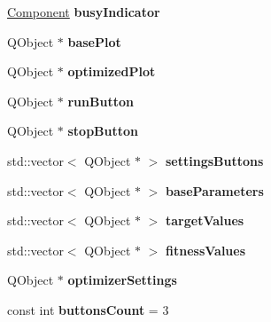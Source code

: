 \begin{DoxyCompactItemize}
\hyperlink{struct_component}{Component} {\bfseries busy\+Indicator}
\item 
\mbox{\label{struct_main_window_objects_ac937bbf4b515456afc0a02a69b864da2}} 
Q\+Object $\ast$ {\bfseries base\+Plot}
\item 
\mbox{\label{struct_main_window_objects_a340c6d92e16fc0e18c084ccb31022002}} 
Q\+Object $\ast$ {\bfseries optimized\+Plot}
\item 
\mbox{\label{struct_main_window_objects_ad56f352e1aef36d43dbfd98d9275a104}} 
Q\+Object $\ast$ {\bfseries run\+Button}
\item 
\mbox{\label{struct_main_window_objects_a0e90147f2b6515e2fb72d81e1a332d52}} 
Q\+Object $\ast$ {\bfseries stop\+Button}
\item 
\mbox{\label{struct_main_window_objects_a98363267c86a7f59c7693ca5be07b3ee}} 
std\+::vector$<$ Q\+Object $\ast$ $>$ {\bfseries settings\+Buttons}
\item 
\mbox{\label{struct_main_window_objects_a1abbb394cc7ea94d4cd9d37f53e373a2}} 
std\+::vector$<$ Q\+Object $\ast$ $>$ {\bfseries base\+Parameters}
\item 
\mbox{\label{struct_main_window_objects_af9867c17eb5a246afe57fef072c42950}} 
std\+::vector$<$ Q\+Object $\ast$ $>$ {\bfseries target\+Values}
\item 
\mbox{\label{struct_main_window_objects_a0c7e32f66c72e8a5d4f59a4a1c3d2ae3}} 
std\+::vector$<$ Q\+Object $\ast$ $>$ {\bfseries fitness\+Values}
\item 
\mbox{\label{struct_main_window_objects_a025c228783402e4171b6b10255e6c299}} 
Q\+Object $\ast$ {\bfseries optimizer\+Settings}
\item 
\mbox{\label{struct_main_window_objects_afefa46ef2b7b2bbb8463510cbd1fa96c}} 
const int {\bfseries buttons\+Count} = 3
\item 

\end{DoxyCompactItemize}
